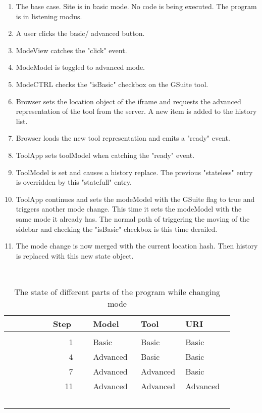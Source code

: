 \documentclass[english]{ifimaster}
\begin{document}
\begin{enumerate}
\item The base case. Site is in basic mode. No code is being executed. The program is in listening modus.
\item A user clicks the basic/ advanced button.
\item ModeView catches the "click" event.
\item ModeModel is toggled to advanced mode.
\item ModeCTRL checks the "isBasic" checkbox on the GSuite tool.
\item Browser sets the location object of the iframe and requests the advanced representation of the tool from the server. A new item is added to the history list.
\item Browser loads the new tool representation and emits a "ready" event.
\item ToolApp sets toolModel when catching the "ready" event.
\item ToolModel is set and causes a history replace. The previous "stateless" entry is overridden by this "statefull" entry.
\item ToolApp continues and sets the modeModel with the GSuite flag to true and triggers another mode change. This time it sets the modeModel with the same mode it already has. The normal path of triggering the moving of the sidebar and checking the "isBasic" checkbox is this time derailed.
\item The mode change is now merged with the current location hash. Then history is replaced with this new state object. 
\end{enumerate}
 
\begin{table}
\centering
    \begin{tabular}{rlll}
    
     Step    & Model    & Tool     & URI      \\ [0.5ex]\hline\\ [0.1ex]
        1    & Basic    & Basic    & Basic    \\ 
        4    & Advanced & Basic    & Basic    \\ 
        7    & Advanced & Advanced & Basic    \\ 
        11    & Advanced & Advanced & Advanced \\[1ex] 

    \end{tabular}
    \caption{The state of different parts of the program while changing mode}
\label{table:1}
\end{table}
\end{document}
